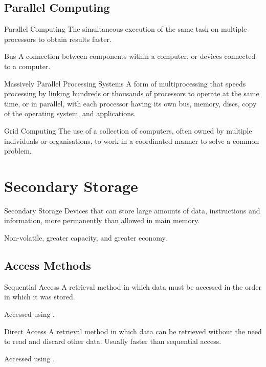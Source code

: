 \documentclass[\main/notes.tex]{subfiles}
\begin{document}
			\subsection{Parallel Computing}
				\begin{definition}{Parallel Computing}
					The simultaneous execution of the same task on multiple processors to obtain results faster.
				\end{definition}
				\begin{definition}{Bus}
					A connection between components within a computer, or devices connected to a computer.
				\end{definition}
				\begin{definition}{Massively Parallel Processing Systems}
					A form of multiprocessing that speeds processing by linking hundreds or thousands of processors to operate at the same time, or in parallel, with each processor having its own bus, memory, discs, copy of the operating system, and applications.
				\end{definition}
				\begin{definition}{Grid Computing}
					The use of a collection of computers, often owned by multiple individuals or organisations, to work in a coordinated manner to solve a common problem.
				\end{definition}
		\pagebreak
		\section{Secondary Storage}
			\begin{definition}{Secondary Storage}
				Devices that can store large amounts of data, instructions and information, more permanently than allowed in main memory.

				Non-volatile, greater capacity, and greater economy.
			\end{definition}
			\subsection{Access Methods}
				\begin{definition}{Sequential Access}
					A retrieval method in which data must be accessed in the order in which it was stored.

					Accessed using .
				\end{definition}
				\begin{definition}{Direct Access}
					A retrieval method in which data can be retrieved without the need to read and discard other data. Usually faster than sequential access.

					Accessed using .
				\end{definition}
\end{document}
